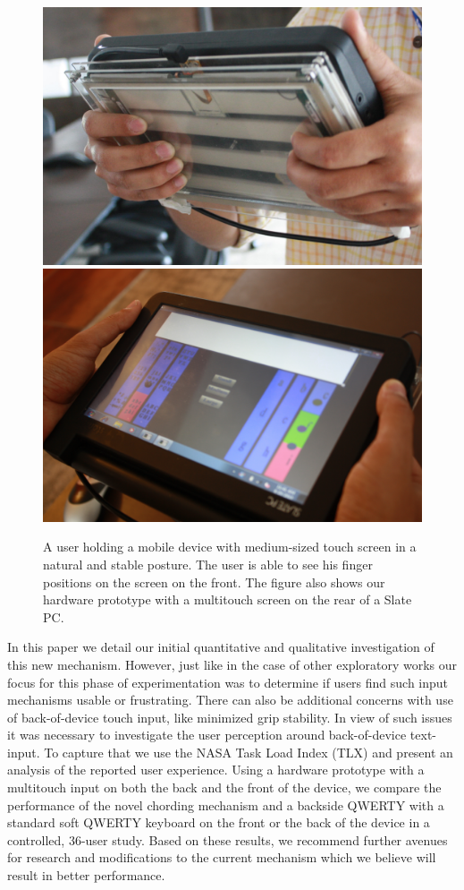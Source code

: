\begin{figure}
    \includegraphics[scale=0.43]{Figures/natural1.pdf} 
     \includegraphics[scale=0.43]{Figures/natural2.pdf} 
     \caption{A user holding a mobile device with medium-sized touch
       screen in a natural and stable posture. The user is able to see
       his finger positions on the screen on the front. The figure
       also shows our hardware prototype with a multitouch screen on
       the rear of a Slate PC.}
        \label{fig:natural}
\end{figure}

In this paper we detail our initial quantitative and qualitative investigation of this new mechanism. However, just like in the case of other exploratory works  our focus for this phase of experimentation was to determine if users find such input mechanisms usable or frustrating. There can also be additional concerns with use of back-of-device touch input, like minimized grip stability. In view of such issues it was necessary to investigate the user perception around back-of-device text-input. To capture that we use the NASA Task Load Index (TLX) and present an analysis of the reported user experience. Using a hardware prototype with a multitouch input on both the back and the front of the device, we compare the performance of the novel chording mechanism and a backside QWERTY with a standard soft QWERTY keyboard on the front or the back of the device in a controlled, 36-user study.  Based on these results, we recommend further avenues for research and modifications to the current mechanism which we believe will result in better performance.
